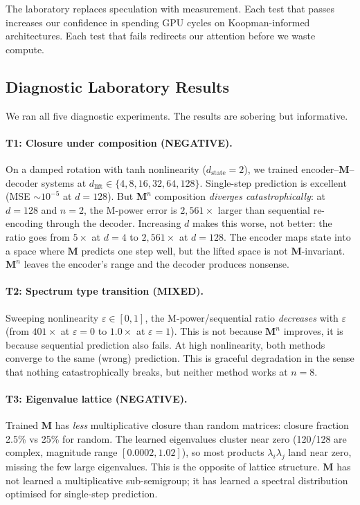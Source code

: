 \documentclass[11pt, a4paper]{article}
\newcommand{\M}{\mathbf{M}}
\theoremstyle{plain}
\theoremstyle{remark}
\begin{document}
The laboratory replaces speculation with measurement.
Each test that passes increases our confidence in spending GPU cycles on Koopman-informed architectures.
Each test that fails redirects our attention before we waste compute.

\subsection{Diagnostic Laboratory Results}\label{sec:koopman-lab-results}

We ran all five diagnostic experiments.
The results are sobering but informative.

\paragraph{T1: Closure under composition (NEGATIVE).}
On a damped rotation with tanh nonlinearity ($d_{\mathrm{state}}{=}2$), we trained encoder--$\M$--decoder systems at $d_{\mathrm{lift}} \in \{4, 8, 16, 32, 64, 128\}$.
Single-step prediction is excellent (MSE $\sim 10^{-5}$ at $d{=}128$).
But $\M^n$ composition \emph{diverges catastrophically}: at $d{=}128$ and $n{=}2$, the M-power error is $2{,}561\times$ larger than sequential re-encoding through the decoder.
Increasing $d$ makes this worse, not better: the ratio goes from $5\times$ at $d{=}4$ to $2{,}561\times$ at $d{=}128$.
The encoder maps state into a space where $\M$ predicts one step well, but the lifted space is not $\M$-invariant.
$\M^n$ leaves the encoder's range and the decoder produces nonsense.

\paragraph{T2: Spectrum type transition (MIXED).}
Sweeping nonlinearity $\varepsilon \in [0, 1]$, the M-power/sequential ratio \emph{decreases} with $\varepsilon$ (from $401\times$ at $\varepsilon{=}0$ to $1.0\times$ at $\varepsilon{=}1$).
This is not because $\M^n$ improves, it is because sequential prediction also fails.
At high nonlinearity, both methods converge to the same (wrong) prediction.
This is graceful degradation in the sense that nothing catastrophically breaks, but neither method works at $n{=}8$.

\paragraph{T3: Eigenvalue lattice (NEGATIVE).}
Trained $\M$ has \emph{less} multiplicative closure than random matrices: closure fraction 2.5\% vs 25\% for random.
The learned eigenvalues cluster near zero (120/128 are complex, magnitude range $[0.0002, 1.02]$), so most products $\lambda_i \lambda_j$ land near zero, missing the few large eigenvalues.
This is the opposite of lattice structure.
$\M$ has not learned a multiplicative sub-semigroup; it has learned a spectral distribution optimised for single-step prediction.
\end{document}
